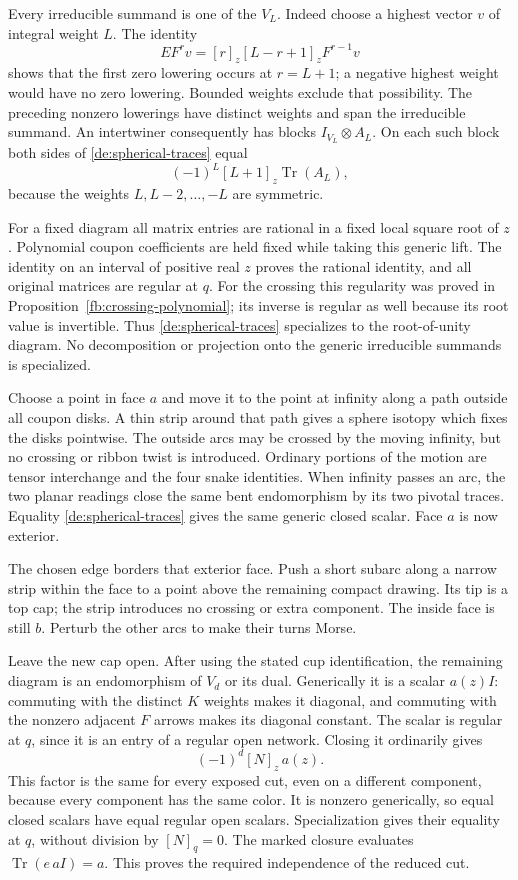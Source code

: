 Every irreducible summand is one of the \(V_L\). Indeed choose a
highest vector \(v\) of integral weight \(L\). The identity
\[
 EF^rv=[r]_z[L-r+1]_zF^{r-1}v
\]
shows that the first zero lowering occurs at \(r=L+1\); a
negative highest weight would have no zero lowering. Bounded
weights exclude that possibility. The preceding nonzero
lowerings have distinct weights and span the irreducible
summand. An intertwiner consequently has blocks
\(I_{V_L}\otimes A_L\). On each such block both sides of
\eqref{de:spherical-traces} equal
\[
                         (-1)^L[L+1]_z\operatorname{Tr}(A_L),
\]
because the weights \(L,L-2,\ldots,-L\) are symmetric.

For a fixed diagram all matrix entries are rational in a fixed
local square root of \(z\). Polynomial coupon coefficients are
held fixed while taking this generic lift. The identity on an
interval of positive real \(z\) proves the rational identity,
and all original matrices are regular at \(q\). For the
crossing this regularity was proved in
Proposition~\ref{fb:crossing-polynomial}; its inverse is regular
as well because its root value is invertible. Thus
\eqref{de:spherical-traces} specializes to the root-of-unity diagram.
No decomposition or projection onto the generic irreducible
summands is specialized.

Choose a point in face \(a\) and move it to the point at infinity
along a path outside all coupon disks. A thin strip around that
path gives a sphere isotopy which fixes the disks pointwise.
The outside arcs may be crossed by the moving infinity, but no
crossing or ribbon twist is introduced. Ordinary portions of the
motion are tensor interchange and the four snake identities.
When infinity passes an arc, the two planar readings close the
same bent endomorphism by its two pivotal traces. Equality
\eqref{de:spherical-traces} gives the same generic closed scalar.
Face \(a\) is now exterior.

The chosen edge borders that exterior face. Push a short subarc
along a narrow strip within the face to a point above the
remaining compact drawing. Its tip is a top cap; the strip
introduces no crossing or extra component. The inside face is
still \(b\). Perturb the other arcs to make their turns Morse.

Leave the new cap open. After using the stated cup identification,
the remaining diagram is an endomorphism of \(V_d\) or its dual.
Generically it is a scalar \(a(z)I\): commuting with the distinct
\(K\) weights makes it diagonal, and commuting with the nonzero
adjacent \(F\) arrows makes its diagonal constant. The scalar is
regular at \(q\), since it is an entry of a regular open network.
Closing it ordinarily gives
\[
                         (-1)^d[N]_z\,a(z).
\]
This factor is the same for every exposed cut, even on a
different component, because every component has the same
color. It is nonzero generically, so equal closed scalars have
equal regular open scalars. Specialization gives their equality
at \(q\), without division by \([N]_q=0\).
The marked closure evaluates \(\operatorname{Tr}(e\,aI)=a\).
This proves the required independence of the reduced cut.

